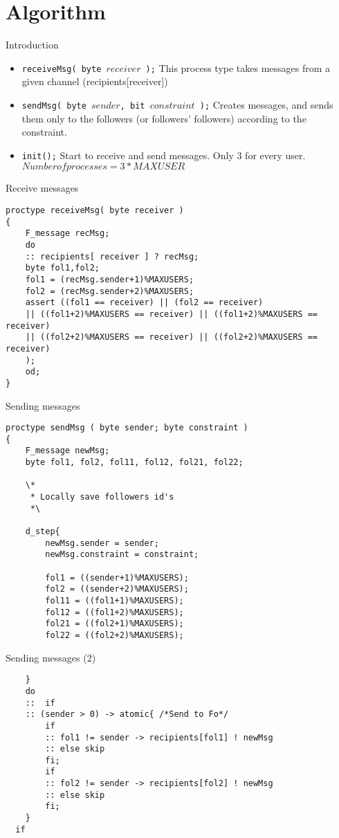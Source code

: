 \documentclass[10pt]{beamer}
\begin{document}
	\section{Algorithm}
	
	\begin{frame}{Introduction}
	\begin{itemize}
		\item \texttt{receiveMsg( byte $receiver$ );} This process type takes messages from a given channel (recipients[receiver])
		\item \texttt{sendMsg( byte $sender$, bit $constraint$ );} Creates messages, and sends them only to the followers (or followers' followers) according to the constraint.
		\item \texttt{init();} Start to receive and send messages. Only 3 for every user. $Number of processes = 3 * MAXUSER$
	\end{itemize}
	\end{frame}
	\begin{frame}[fragile]{Receive messages}
		\begin{lstlisting}
proctype receiveMsg( byte receiver )
{
	F_message recMsg;
	do
	:: recipients[ receiver ] ? recMsg;
	byte fol1,fol2;
	fol1 = (recMsg.sender+1)%MAXUSERS;
	fol2 = (recMsg.sender+2)%MAXUSERS;
	assert ((fol1 == receiver) || (fol2 == receiver)
	|| ((fol1+2)%MAXUSERS == receiver) || ((fol1+2)%MAXUSERS == receiver)
	|| ((fol2+2)%MAXUSERS == receiver) || ((fol2+2)%MAXUSERS == receiver)
	);
	od;
}
		\end{lstlisting}
	\end{frame}	
	
	\begin{frame}[fragile]{Sending messages}
		\begin{lstlisting}
proctype sendMsg ( byte sender; byte constraint )
{
	F_message newMsg;
	byte fol1, fol2, fol11, fol12, fol21, fol22;
	
	\*
	 * Locally save followers id's
	 *\
		
	d_step{
		newMsg.sender = sender;
		newMsg.constraint = constraint;	
		
		fol1 = ((sender+1)%MAXUSERS);
		fol2 = ((sender+2)%MAXUSERS);
		fol11 = ((fol1+1)%MAXUSERS);
		fol12 = ((fol1+2)%MAXUSERS);
		fol21 = ((fol2+1)%MAXUSERS);
		fol22 = ((fol2+2)%MAXUSERS);	

			\end{lstlisting}
	\end{frame}	
	
	\begin{frame}[fragile]{Sending messages (2)}
		\begin{lstlisting}
	}
	do
	::  if
	:: (sender > 0) -> atomic{ /*Send to Fo*/
		if 
		:: fol1 != sender -> recipients[fol1] ! newMsg
		:: else skip
		fi;
		if
		:: fol2 != sender -> recipients[fol2] ! newMsg	
		:: else skip
		fi;
	}
  if

		\end{lstlisting}
	\end{frame}
	
\end{document}

